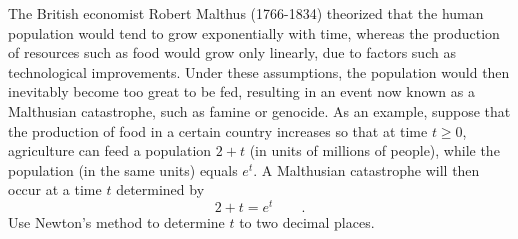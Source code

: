 The British economist Robert Malthus (1766-1834)
theorized that the human population would tend to grow
exponentially with time, whereas the production of resources
such as food would grow only linearly, due to factors such as technological improvements.
Under these assumptions, the
population would then inevitably become too great to be fed,
resulting in an event now known as a Malthusian catastrophe, such as famine or
genocide. As an example, suppose that the production of food
in a certain country increases so that at time $t\ge0$, agriculture
can feed a population $2+t$ (in units of millions of
people), while the population (in the same units) equals $e^t$.
A Malthusian catastrophe will then occur at a time $t$ determined by
\begin{equation*}
  2+t = e^t \qquad .
\end{equation*}
Use Newton's method to determine $t$ to two decimal places.
